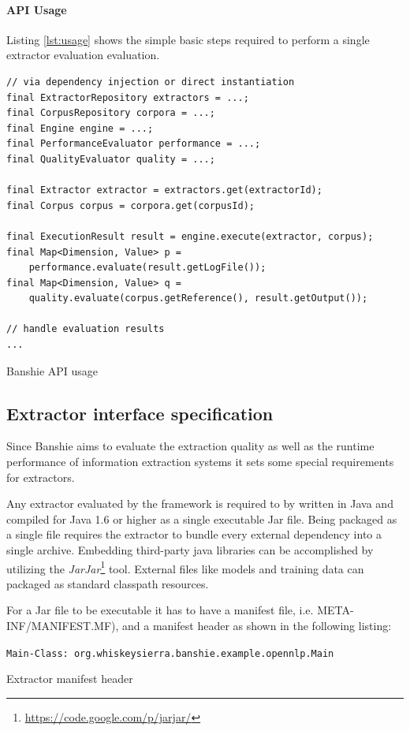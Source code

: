 \newpage
\paragraph{API Usage}
Listing \ref{lst:usage} shows the simple basic steps required to perform a single extractor evaluation evaluation.

\begin{listing}[H]
\begin{verbatim}
// via dependency injection or direct instantiation
final ExtractorRepository extractors = ...;
final CorpusRepository corpora = ...;
final Engine engine = ...;
final PerformanceEvaluator performance = ...;
final QualityEvaluator quality = ...;

final Extractor extractor = extractors.get(extractorId);
final Corpus corpus = corpora.get(corpusId);

final ExecutionResult result = engine.execute(extractor, corpus);
final Map<Dimension, Value> p = 
    performance.evaluate(result.getLogFile());
final Map<Dimension, Value> q = 
    quality.evaluate(corpus.getReference(), result.getOutput());

// handle evaluation results
...
\end{verbatim}
\caption{Banshie API usage}
\label{lst:usage}
\end{listing}

\subsection{Extractor interface specification}
Since Banshie aims to evaluate the extraction quality as well as the runtime performance of information extraction systems it sets some special requirements for extractors.

Any extractor evaluated by the framework is required to by written in Java and compiled for Java 1.6 or higher as a single executable Jar file. Being packaged as a single file requires the extractor to bundle every external dependency into a single archive. Embedding third-party java libraries can be accomplished by utilizing the \textit{JarJar}\footnote{\url{https://code.google.com/p/jarjar/}} tool. External files like models and training data can packaged as standard classpath resources.

For a Jar file to be executable it has to have a manifest file, i.e. META-INF/MANIFEST.MF), and a manifest header as shown in the following listing:

\begin{listing}[H]
\texttt{Main-Class: org.whiskeysierra.banshie.example.opennlp.Main}
\caption{Extractor manifest header}
\end{listing}

